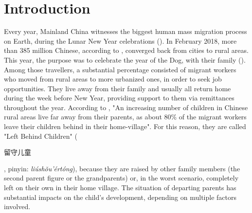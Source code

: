 \section{Introduction}
\label{sec:introduction}

Every year, Mainland China witnesses the biggest human mass migration process on Earth, during the Lunar New Year celebrations (\cite{zhang2015mass}). In February 2018, more than 385 million Chinese, according to \textcite{forbes2018springfestival}, converged back from cities to rural areas. This year, the purpose was to celebrate the year of the Dog, with their family (\cite{forbes2018springfestival}). Among those travellers, a substantial percentage consisted of migrant workers who moved from rural areas to more urbanized ones, in order to seek job opportunities. They live away from their family and usually all return home during the week before New Year, providing support to them via remittances throughout the year. According to \cite{guo2017effect}, "An increasing number of children in Chinese rural areas live far away from their parents, as about 80\% of the migrant workers leave their children behind in their home-village". For this reason, they are called "Left Behind Children"  (\begin{CJK*}{UTF8}{gbsn} 留守儿童\end{CJK*}, pinyin: \textit{liúshǒu'értóng}), because they are raised by other family members (the second parent figure or the grandparents) or, in the worst scenario, completely left on their own in their home village. The situation of departing parents has substantial impacts on the child's development, depending on multiple factors involved.

